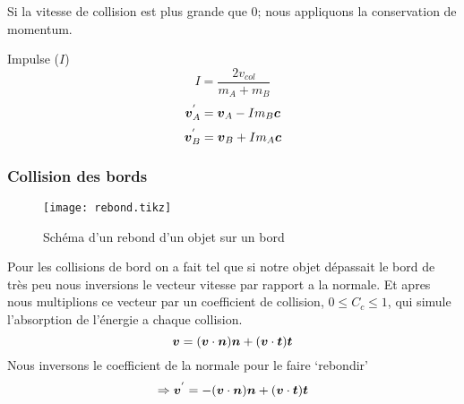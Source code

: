             Si la vitesse de collision est plus grande que 0; nous appliquons la conservation de momentum.
            
            Impulse ($I$)
            \begin{equation}
                I = \frac{2v_{col}}{m_A + m_B}
            \end{equation}
            \begin{equation}
                \vb*{v}_A^{'} = \vb*{v}_A - Im_B\vb*{c}
            \end{equation}
            \begin{equation}
                \vb*{v}_B^{'} = \vb*{v}_B + Im_A\vb*{c}
            \end{equation}
            

        \subsubsection{Collision des bords}
            \begin{wrapfigure}{r}{0.25\textwidth}
                \centering
                \texttt{[image: rebond.tikz]}
                \caption{Schéma d'un rebond d'un objet sur un bord}
            \end{wrapfigure}
            Pour les collisions de bord on a fait tel que si notre objet dépassait le bord de très peu nous inversions le vecteur vitesse par rapport a la normale. Et apres nous multiplions ce vecteur par un coefficient de collision, $0 \leq C_c \leq 1$, qui simule l’absorption de l'énergie a chaque collision. 
            \begin{equation}
                \vb*{v} = (\vb*{v}\cdot\vb*{n})\vb*{n} +(\vb*{v}\cdot\vb*{t})\vb*{t}
            \end{equation}
            Nous inversons le coefficient de la normale pour le faire `rebondir'
            \begin{equation}
                \Rightarrow\vb*{v}^{'} = -(\vb*{v}\cdot\vb*{n})\vb*{n} + (\vb*{v}\cdot\vb*{t})\vb*{t}
            \end{equation}
